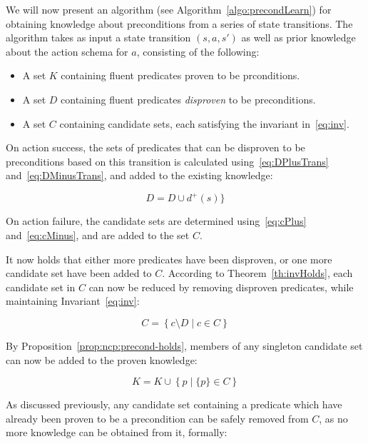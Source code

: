 \documentclass[../../Master.tex]{subfiles}
\begin{document}
We will now present an algorithm (see Algorithm~\ref{algo:precondLearn}) for obtaining knowledge about preconditions from a series of state transitions. The algorithm takes as input a state transition $(s, a, s')$ as well as prior knowledge about the action schema for $a$, consisting of the following:

\begin{itemize}
    \item A set $K$ containing fluent predicates proven to be prconditions.
	\item A set $D$ containing fluent predicates \emph{disproven} to be preconditions.
    \item A set $C$ containing candidate sets, each satisfying the invariant in~\eqref{eq:inv}.
\end{itemize}

On action success, the sets of predicates that can be disproven to be preconditions based on this transition is calculated using~\eqref{eq:DPlusTrans} and~\eqref{eq:DMinusTrans}, and added to the existing knowledge:

\begin{equation*}
    D = D \cup d^+(s)\}
\end{equation*}

On action failure, the candidate sets are determined using~\eqref{eq:cPlus} and~\eqref{eq:cMinus}, and are added to the set $C$.

It now holds that either more predicates have been disproven, or one more candidate set have been added to $C$. According to Theorem~\ref{th:invHolds}, each candidate set in $C$ can now be reduced by removing disproven predicates, while maintaining Invariant~\eqref{eq:inv}:

\begin{equation} \label{reduceCands}
    C = \left\{ c \setminus D \; | \; c \in C \right\}
\end{equation}

By Proposition~\ref{prop:ncp:precond-holds}, members of any singleton candidate set can now be added to the proven knowledge:

\begin{equation} \label{eq:extractKnown}
    K = K \cup \left\{ p \; | \; \{ p \} \in C \right\}
\end{equation}

As discussed previously, any candidate set containing a predicate which have already been proven to be a precondition can be safely removed from $C$, as no more knowledge can be obtained from it, formally:
\end{document}
